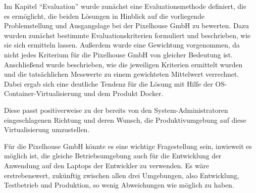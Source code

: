 Im Kapitel "`Evaluation"' wurde zunächst eine Evaluationsmethode definiert, die es ermöglicht, die beiden Lösungen in Hinblick auf die vorliegende Problemstellung und Ausgangslage bei der Pixelhouse GmbH zu bewerten. Dazu wurden zunächst bestimmte Evaluationskriterien formuliert und beschrieben, wie sie sich ermitteln lassen. Außerdem wurde eine Gewichtung vorgenommen, da nicht jedes Kriterium für die Pixelhouse GmbH von gleicher Bedeutung ist. Anschließend wurde beschrieben, wie die jeweiligen Kriterien ermittelt wurden und die tatsächlichen Messwerte zu einem gewichteten Mittelwert verrechnet. Dabei ergab sich eine deutliche Tendenz für die Lösung mit Hilfe der OS-Container-Virtualisierung und dem Produkt Docker.

Diese passt positiverweise zu der bereits von den System-Administratoren eingeschlagenen Richtung und deren Wunsch, die Produktivumgebung auf diese Virtualisierung umzustellen.

Für die Pixelhouse GmbH könnte es eine wichtige Fragestellung sein, inwieweit es möglich ist, die gleiche Betriebsumgebung auch für die Entwicklung der Anwendung auf den Laptops der Entwickler zu verwenden. Es wäre erstrebenswert, zukünftig zwischen allen drei Umgebungen, also Entwicklung, Testbetrieb und Produktion, so wenig Abweichungen wie möglich zu haben.